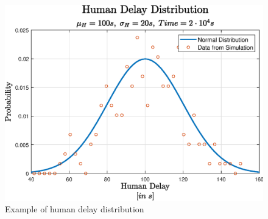 \documentclass[10pt,a4paper]{article}
\begin{document}
			\begin{figure}[H]
				\centering
				\includegraphics[scale = 0.65]{Images/humanDelay}
				\caption{Example of human delay distribution}
			\end{figure}
\end{document}
